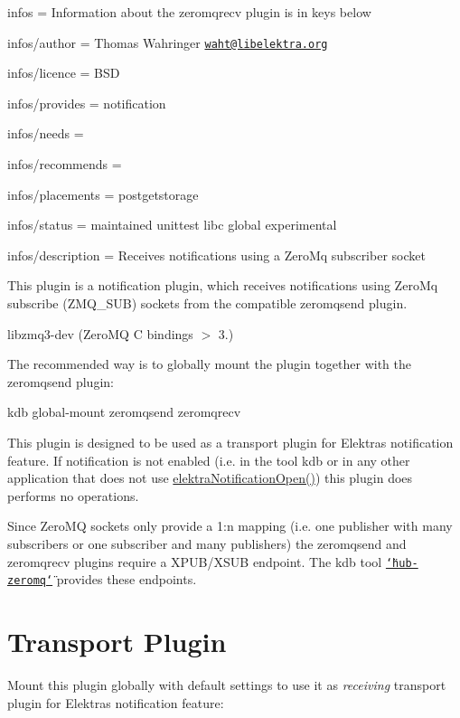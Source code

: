 
\begin{DoxyItemize}
\item infos = Information about the zeromqrecv plugin is in keys below
\item infos/author = Thomas Wahringer \href{mailto:waht@libelektra.org}{\tt waht@libelektra.\+org}
\item infos/licence = B\+SD
\item infos/provides = notification
\item infos/needs =
\item infos/recommends =
\item infos/placements = postgetstorage
\item infos/status = maintained unittest libc global experimental
\item infos/description = Receives notifications using a Zero\+Mq subscriber socket
\end{DoxyItemize}

This plugin is a notification plugin, which receives notifications using Zero\+Mq subscribe ({\ttfamily Z\+M\+Q\+\_\+\+S\+UB}) sockets from the compatible zeromqsend plugin.


\begin{DoxyItemize}
\item {\ttfamily libzmq3-\/dev} (Zero\+MQ C bindings $>$ 3.)
\end{DoxyItemize}

The recommended way is to globally mount the plugin together with the zeromqsend plugin\+: \begin{DoxyVerb}kdb global-mount zeromqsend zeromqrecv
\end{DoxyVerb}


This plugin is designed to be used as a transport plugin for Elektra\textquotesingle{}s notification feature. If notification is not enabled (i.\+e. in the tool {\ttfamily kdb} or in any other application that does not use {\ttfamily \hyperlink{group__kdbnotification_gaeae96154abdb5fdbf1b34a01e2b23e44}{elektra\+Notification\+Open()}}) this plugin does performs no operations.

Since Zero\+MQ sockets only provide a 1\+:n mapping (i.\+e. one publisher with many subscribers or one subscriber and many publishers) the {\ttfamily zeromqsend} and {\ttfamily zeromqrecv} plugins require a X\+P\+U\+B/\+X\+S\+UB endpoint. The kdb tool \href{https://www.libelektra.org/tools/hub-zeromq}{\tt \char`\"{}hub-\/zeromq\char`\"{}} provides these endpoints.\hypertarget{autotoc_md940_autotoc_md943}{}\section{Transport Plugin}\label{autotoc_md940_autotoc_md943}
Mount this plugin globally with default settings to use it as {\itshape receiving} transport plugin for Elektra\textquotesingle{}s notification feature\+:

